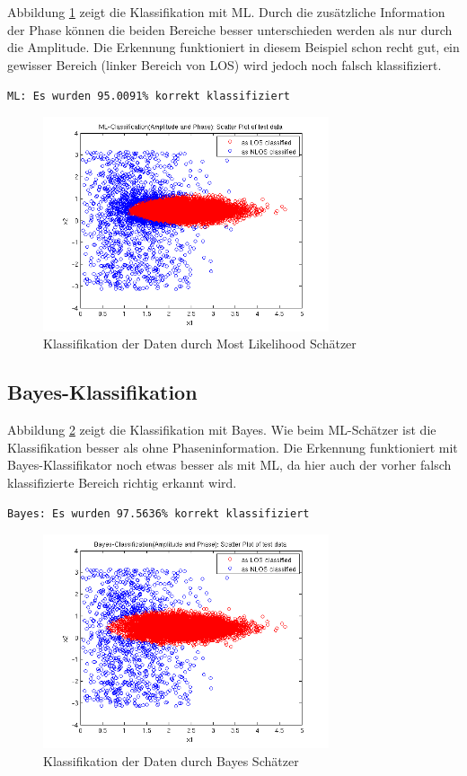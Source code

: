 Abbildung \ref{fig:5_1_2_ml} zeigt die Klassifikation mit ML. Durch die zusätzliche Information der Phase können die beiden Bereiche besser unterschieden werden als nur durch die Amplitude. Die Erkennung funktioniert in diesem Beispiel schon recht gut, ein gewisser Bereich (linker Bereich von LOS) wird jedoch noch falsch klassifiziert.

\texttt{ML: Es wurden 95.0091\% korrekt klassifiziert}

\begin{figure}[h!]
  \centering
  \includegraphics[width=0.75\textwidth]{./figures/5_1_2_ml.png}
  \caption{Klassifikation der Daten durch Most Likelihood Schätzer}
  \label{fig:5_1_2_ml}
\end{figure}


\subsection{Bayes-Klassifikation}

Abbildung \ref{fig:5_1_2_bayes} zeigt die Klassifikation mit Bayes. Wie beim ML-Schätzer ist die Klassifikation besser als ohne Phaseninformation. Die Erkennung funktioniert mit Bayes-Klassifikator noch etwas besser als mit ML, da hier auch der vorher falsch klassifizierte Bereich richtig erkannt wird.

\texttt{Bayes: Es wurden 97.5636\% korrekt klassifiziert}

\begin{figure}[h!]
  \centering
  \includegraphics[width=0.75\textwidth]{./figures/5_1_2_bayes.png}
  \caption{Klassifikation der Daten durch Bayes Schätzer}
  \label{fig:5_1_2_bayes}
\end{figure}
